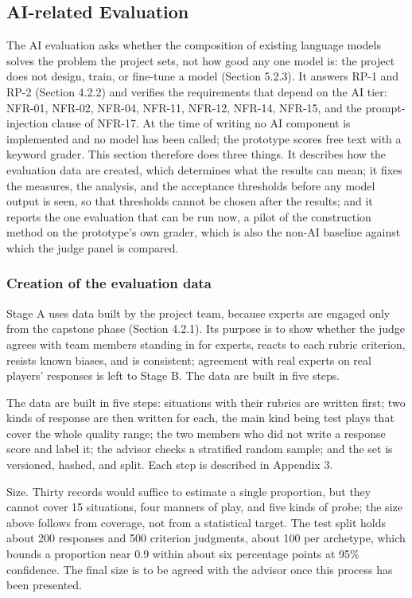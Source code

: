 \subsection{AI-related Evaluation}

The AI evaluation asks whether the composition of existing language models solves the problem the project sets, not how good any one model is: the project does not design, train, or fine-tune a model (Section 5.2.3). It answers RP-1 and RP-2 (Section 4.2.2) and verifies the requirements that depend on the AI tier: NFR-01, NFR-02, NFR-04, NFR-11, NFR-12, NFR-14, NFR-15, and the prompt-\allowbreak{}injection clause of NFR-17. At the time of writing no AI component is implemented and no model has been called; the prototype scores free text with a keyword grader. This section therefore does three things. It describes how the evaluation data are created, which determines what the results can mean; it fixes the measures, the analysis, and the acceptance thresholds before any model output is seen, so that thresholds cannot be chosen after the results; and it reports the one evaluation that can be run now, a pilot of the construction method on the prototype's own grader, which is also the non-AI baseline against which the judge panel is compared.

\subsubsection{Creation of the evaluation data}

Stage A uses data built by the project team, because experts are engaged only from the capstone phase (Section 4.2.1). Its purpose is to show whether the judge agrees with team members standing in for experts, reacts to each rubric criterion, resists known biases, and is consistent; agreement with real experts on real players' responses is left to Stage B. The data are built in five steps.

The data are built in five steps: situations with their rubrics are written first; two kinds of response are then written for each, the main kind being test plays that cover the whole quality range; the two members who did not write a response score and label it; the advisor checks a stratified random sample; and the set is versioned, hashed, and split. Each step is described in Appendix 3.

Size. Thirty records would suffice to estimate a single proportion, but they cannot cover 15 situations, four manners of play, and five kinds of probe; the size above follows from coverage, not from a statistical target. The test split holds about 200 responses and 500 criterion judgments, about 100 per archetype, which bounds a proportion near 0.9 within about six percentage points at 95\% confidence. The final size is to be agreed with the advisor once this process has been presented.

